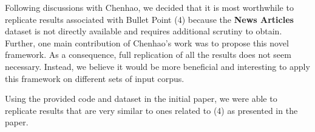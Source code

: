 \documentclass[11pt,a4paper]{article}
\begin{document}

Following discussions with Chenhao, we decided that it is most worthwhile to replicate
results associated with Bullet Point (4) because the \textbf{News Articles} dataset
is not directly available and requires additional scrutiny to obtain. Further,
one main contribution of Chenhao's work was to propose this
novel framework. As a consequence, full replication of all the results
does not seem necessary. Instead, we believe it would be more
beneficial and interesting to apply this framework on different sets
of input corpus.

Using the provided code 
and dataset in the initial paper, we were able to replicate results that are
very similar to ones related to (4) as presented in the paper.
\end{document}
